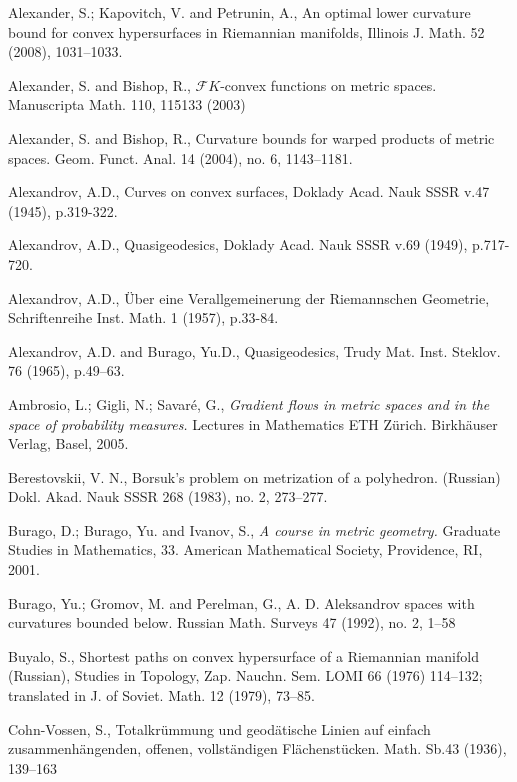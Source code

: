 \documentclass{article}
\begin{document}
\begin{thebibliography}{Bibliography} 


Alexander, S.;  
Kapovitch, V. 
and 
Petrunin, A., 
An optimal lower curvature bound for convex hypersurfaces in Riemannian manifolds, Illinois J. Math. 52 (2008), 1031--1033. 

 Alexander, S. and
Bishop, R., $\mathcal F
K$-convex functions on metric spaces. Manuscripta Math. 110, 115133 (2003)

 Alexander, S. and  Bishop, R., 
Curvature bounds for warped products of metric spaces.  Geom. Funct. Anal.  14  (2004),  no. 6, 1143--1181.


 Alexandrov, A.D.,
Curves on convex surfaces, Doklady
Acad. Nauk SSSR
v.47 (1945), p.319-322.

 Alexandrov, A.D., Quasigeodesics, Doklady Acad. Nauk SSSR v.69 (1949),
p.717-720.

 Alexandrov, A.D., \"Uber eine Verallgemeinerung der Riemannschen Geometrie,
Schriftenreihe Inst. Math. 1 (1957), p.33-84.

  Alexandrov, A.D. and  Burago, Yu.D., Quasigeodesics, Trudy Mat. Inst. Steklov.
76 (1965), p.49--63.

 Ambrosio, L.; Gigli, N.; Savar\'e, G.,
\textit{Gradient flows in metric spaces and in the space of probability measures.} Lectures in Mathematics ETH Zürich. Birkhäuser Verlag, Basel, 2005. 

Berestovskii, V. N.,
Borsuk's problem on metrization of a polyhedron. (Russian)
Dokl. Akad. Nauk SSSR 268 (1983), no. 2, 273--277.

Burago, D.; Burago, Yu. and Ivanov, S., 
\textit{A course in metric geometry.} Graduate Studies in Mathematics, 33. American Mathematical Society, Providence, RI, 2001.


Burago, Yu.; 
Gromov, M. and Perelman, G., 
A. D. Aleksandrov spaces
with curvatures bounded below.  Russian Math. Surveys  47  (1992),  no. 2,
1--58

Buyalo, S., 
Shortest paths on convex
hypersurface of a Riemannian manifold (Russian), Studies in Topology, Zap. Nauchn. Sem.
LOMI 66 (1976) 114--132; translated in J. of Soviet. Math. 12 (1979), 73--85.

Cohn-Vossen, S., 
Totalkr\"ummung und geod\"atische Linien auf einfach zusammenh\"angenden, offenen, vollst\"andigen Fl\"achenst\"ucken. Math. Sb.43 (1936), 139--163


\end{thebibliography}
\end{document}
